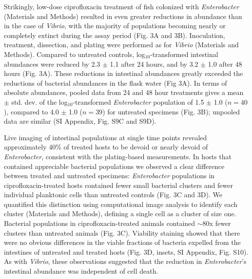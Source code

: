 Strikingly, low-dose ciprofloxacin treatment of fish colonized with \textit{Enterobacter}  (Materials and Methods) resulted in even greater reductions in abundance than in the case of \textit{Vibrio}, with the majority of populations becoming nearly or completely extinct during the assay period (Fig. 3A and 3B). Inoculation, treatment, dissection, and plating were performed as for \textit{Vibrio} (Materials and Methods). Compared to untreated controls, log$_{10}$-transformed intestinal abundances were reduced by 2.3 $\pm$ 1.1 after 24 hours, and by 3.2 $\pm$ 1.0 after 48 hours (Fig. 3A). These reductions in intestinal abundances greatly exceeded the reductions of bacterial abundances in the flask water (Fig 3A). In terms of absolute abundances, pooled data from 24 and 48 hour treatments gives a mean $\pm$ std. dev. of the log$_{10}$-transformed \textit{Enterobacter}  population of 1.5 $\pm$ 1.0 ($n=40$), compared to 4.0 $\pm$ 1.0 ($n=39$) for untreated specimens (Fig. 3B); unpooled data are similar (SI Appendix, Fig. S9C and S9D). 

Live imaging of intestinal populations at single time points revealed approximately 40\% of treated hosts to be devoid or nearly devoid of \textit{Enterobacter}, consistent with the plating-based measurements. In hosts that contained appreciable bacterial populations we observed a clear difference between treated and untreated specimens: \textit{Enterobacter}  populations in ciprofloxacin-treated hosts contained fewer small bacterial clusters and fewer individual planktonic cells than untreated controls (Fig. 3C and 3D). We quantified this distinction using computational image analysis to identify each cluster (Materials and Methods), defining a single cell as a cluster of size one. Bacterial populations in ciprofloxacin-treated animals contained $\sim$80x fewer clusters than untreated animals (Fig. 3C). Viability staining showed that there were no obvious differences in the viable fractions of bacteria expelled from the intestines of untreated and treated hosts (Fig. 3D, insets, SI Appendix, Fig. S10). As with \textit{Vibrio}, these observations suggested that the reduction in \textit{Enterobacter}'s intestinal abundance was independent of cell death.  


